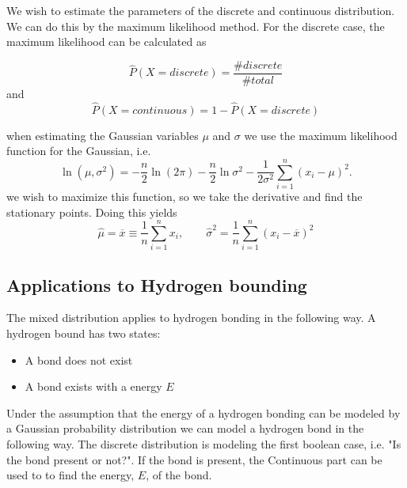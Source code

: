 \documentclass[10pt, conference, compsocconf,a4paper]{IEEEtran}
\begin{document}
We wish to estimate the parameters of the discrete and continuous distribution. We can do this by the maximum likelihood method. For the discrete case, the maximum likelihood can be calculated as

\begin{equation}
  \hat{P}(X = discrete) = \frac{\#discrete}{\#total} 
\end{equation}
and
\begin{equation}
  \hat{P}(X = continuous) = 1 - \hat{P}(X = discrete)
\end{equation}

when estimating the Gaussian variables $\mu$ and $\sigma$ we use the maximum likelihood function for the Gaussian, i.e.
\begin{equation}
  \ln(\mu, \sigma^2) = -\frac{n}{2}\ln(2\pi) - \frac{n}{2}\ln\sigma^2 - \frac{1}{2\sigma^2}\sum_{i=1}^n (x_i-\mu)^2.
\end{equation}
we wish to maximize this function, so we take the derivative and find the stationary points. Doing this yields
\begin{equation}
  \hat{\mu} = \overline{x} \equiv \frac{1}{n}\sum_{i=1}^n x_i, \qquad \hat{\sigma}^2 = \frac{1}{n} \sum_{i=1}^n (x_i - \overline{x})^2
\end{equation}




\subsection{Applications to Hydrogen bounding} %
\label{sub:applications_to_hydrogen_bounding}
The mixed distribution applies to hydrogen bonding in the following way. A hydrogen bound has two states:

\begin{itemize}
  \item A bond does not exist
  \item A bond exists with a energy $E$
\end{itemize}

Under the assumption that the energy of a hydrogen bonding can be modeled by a Gaussian probability distribution we can model a hydrogen bond in the following way. The discrete distribution is modeling the first boolean case, i.e. "Is the bond present or not?". If the bond is present, the Continuous part can be used to to find the energy, $E$, of the bond.
\end{document}
